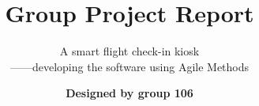 \documentclass{layout/tudelft-report}
\begin{document}
\frontmatter

\title{\textbf{Group Project Report}}
\subtitle{A smart flight check-in kiosk \\ ——developing the software using Agile Methods}
\author{\textbf{Designed by group 106}}
\subject{EBU6304: SOFTWARE ENGINEERING}







\tableofcontents



\mainmatter








\setcounter{biburlnumpenalty}{7000}
\setcounter{biburllcpenalty}{7000}
\setcounter{biburlucpenalty}{7000}

\printbibliography[heading=bibintoc,title=References]

\appendix



\end{document}

